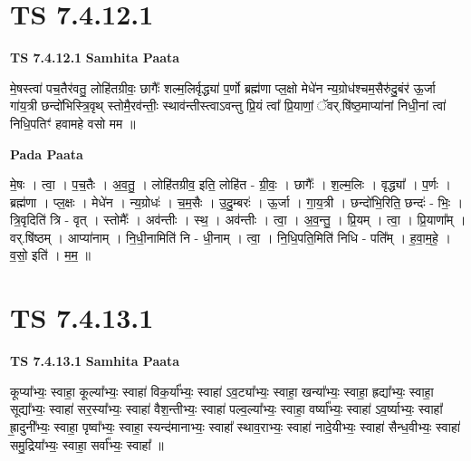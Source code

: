 \documentclass[17pt]{extarticle}
\begin{document}

\section{ TS 7.4.12.1 }

\textbf{TS 7.4.12.1 } \newline
\textbf{Samhita Paata} \newline

मे॒षस्त्वा॑ पच॒तैर॑वतु॒ लोहि॑तग्रीवः॒ छागैः᳚ शल्म॒लिर्वृद्ध्या॑ प॒र्णो ब्रह्म॑णा प्ल॒क्षो मेधे॑न न्य॒ग्रोध॑श्चम॒सैरु॑दु॒बंर॑ ऊ॒र्जा गा॑य॒त्री छन्दो॑भिस्त्रि॒वृथ् स्तोमै॒रव॑न्तीः॒ स्थाव॑न्तीस्त्वाऽवन्तु प्रि॒यं त्वा᳚ प्रि॒याणां॒ ॅवर्.षि॑ष्ठ॒माप्या॑नां निधी॒नां त्वा॑ निधि॒पतिꣳ॑ हवामहे वसो मम ॥ \newline

\textbf{Pada Paata} \newline

मे॒षः । त्वा॒ । प॒च॒तैः । अ॒व॒तु॒ । लोहि॑तग्रीव॒ इति॒ लोहि॑त - ग्री॒वः॒ । छागैः᳚ । श॒ल्म॒लिः । वृद्ध्या᳚ । प॒र्णः । ब्रह्म॑णा । प्ल॒क्षः । मेधे॑न । न्य॒ग्रोधः॑ । च॒म॒सैः । उ॒दु॒म्बरः॑ । ऊ॒र्जा । गा॒य॒त्री । छन्दो॑भि॒रिति॒ छन्दः॑ - भिः॒ । त्रि॒वृदिति॑ त्रि - वृत् । स्तोमैः᳚ । अव॑न्तीः । स्थ॒ । अव॑न्तीः । त्वा॒ । अ॒व॒न्तु॒ । प्रि॒यम् । त्वा॒ । प्रि॒याणा᳚म् । वर्.षि॑ष्ठम् । आप्या॑नाम् । नि॒धी॒नामिति॑ नि - धी॒नाम् । त्वा॒ । नि॒धि॒पति॒मिति॑ निधि - पति᳚म् । ह॒वा॒म॒हे॒ । व॒सो॒ इति॑ । म॒म॒ ॥  \newline





\section{ TS 7.4.13.1 }

\textbf{TS 7.4.13.1 } \newline
\textbf{Samhita Paata} \newline

कूप्या᳚भ्यः॒ स्वाहा॒ कूल्या᳚भ्यः॒ स्वाहा॑ विक॒र्या᳚भ्यः॒ स्वाहा॑ ऽव॒ट्या᳚भ्यः॒ स्वाहा॒ खन्या᳚भ्यः॒ स्वाहा॒ ह्रद्या᳚भ्यः॒ स्वाहा॒ सूद्या᳚भ्यः॒ स्वाहा॑ सर॒स्या᳚भ्यः॒ स्वाहा॑ वैश॒न्तीभ्यः॒ स्वाहा॑ पल्व॒ल्या᳚भ्यः॒ स्वाहा॒ वर्ष्या᳚भ्यः॒ स्वाहा॑ ऽव॒र्ष्याभ्यः॒ स्वाहा᳚ ह्रा॒दुनी᳚भ्यः॒ स्वाहा॒ पृष्वा᳚भ्यः॒ स्वाहा॒ स्यन्द॑मानाभ्यः॒ स्वाहा᳚ स्थाव॒राभ्यः॒ स्वाहा॑ नादे॒यीभ्यः॒ स्वाहा॑ सैन्ध॒वीभ्यः॒ स्वाहा॑ समु॒द्रिया᳚भ्यः॒ स्वाहा॒ सर्वा᳚भ्यः॒ स्वाहा᳚ ॥ \newline
\end{document}
